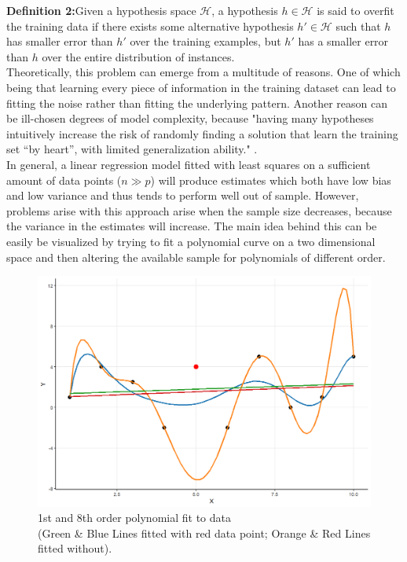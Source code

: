 \documentclass[12pt,a4paper]{article}
\begin{document}
\textbf{Definition 2:}Given a hypothesis space $\mathcal{H}$, a hypothesis $h \in \mathcal{H}$ is said to overfit the training data if there exists some alternative hypothesis $h' \in \mathcal{H}$ such that $h$ has smaller error than $h'$ over the training examples, but $h'$ has a smaller error than $h$ over the entire distribution of instances.\\

Theoretically, this problem can emerge from a multitude of reasons. One of which being that learning every piece of information in the training dataset can lead to fitting the noise rather than fitting the underlying pattern. Another reason can be ill-chosen degrees of model complexity, because "having many hypotheses intuitively increase the risk of randomly finding a solution that learn the training set “by heart”, with limited generalization ability." \parencite{ParisRobilliardFonlupt2003}.\\  

In general, a linear regression model fitted with least squares on a sufficient amount of data points ($n \gg p$) will produce estimates which both have low bias and low variance and thus tends to perform well out of sample. However, problems arise with this approach arise when the sample size decreases, because the variance in the estimates will increase. The main idea behind this can be easily be visualized by trying to fit a polynomial curve on a two dimensional space and then altering the available sample for polynomials of different order. 
\begin{figure}
\centering
\includegraphics[scale=0.5]{PolynomialFit_Plot.png}
\caption{1st and 8th order polynomial fit to data \\ (\textcolor{green1}{Green} \& \textcolor{blue1}{Blue} Lines fitted with red data point; \textcolor{orange1}{Orange} \& \textcolor{red1}{Red} Lines fitted without).}
\label{fig:polyfit}
\end{figure}
\end{document}
